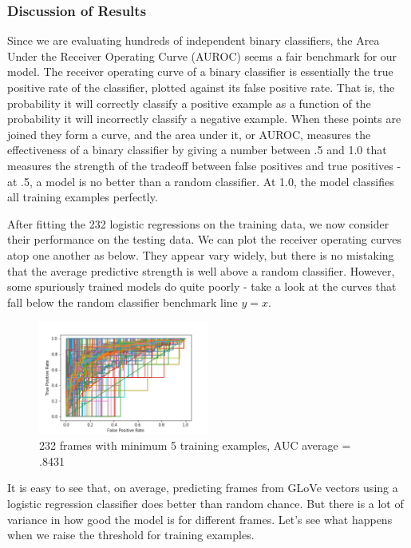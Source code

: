 \documentclass[11pt,a4paper]{article}
\begin{document}
\subsubsection{Discussion of Results}

Since we are evaluating hundreds of independent binary classifiers, the Area Under the Receiver Operating Curve (AUROC) seems a fair benchmark for our model. The receiver operating curve of a binary classifier is essentially the true positive rate of the classifier, plotted against its false positive rate. That is, the probability it will correctly classify a positive example as a function of the probability it will incorrectly classify a negative example. When these points are joined they form a curve, and the area under it, or AUROC, measures the effectiveness of a binary classifier by giving a number between .5 and 1.0 that measures the strength of the tradeoff between false positives and true positives - at .5, a model is no better than a random classifier. At 1.0, the model classifies all training examples perfectly. 

After fitting the 232 logistic regressions on the training data, we now consider their performance on the testing data. We can plot the receiver operating curves atop one another as below. They appear vary widely, but there is no mistaking that the average predictive strength is well above a random classifier. However, some spuriously trained models do quite poorly - take a look at the curves that fall below the random classifier benchmark line $y = x$.  

\begin{figure}
	\centering
	\includegraphics[width=0.5\textwidth]{AUC_plot5.png}
	\caption{\label{fig:frog} 232 frames with minimum 5 training examples, AUC average = .8431}
\end{figure}

It is easy to see that, on average, predicting frames from GLoVe vectors using a logistic regression classifier does better than random chance. But there is a lot of variance in how good the model is for different frames. Let's see what happens when we raise the threshold for training examples.
\end{document}
